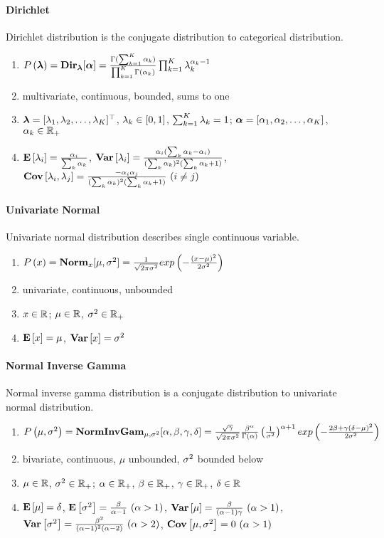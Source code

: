 \paragraph{Dirichlet}

Dirichlet distribution is the conjugate distribution to categorical distribution.
\begin{enumerate}
	\item $P\left(\boldsymbol{\lambda}\right)=\mathbf{Dir}_{\boldsymbol{\lambda}}[\boldsymbol{\alpha}]=\frac{\Gamma(\sum_{k=1}^K\alpha_k)}{\prod_{k=1}^K\Gamma(\alpha_k)}\prod_{k=1}^K\lambda_k^{\alpha_k-1}$
	\item multivariate, continuous, bounded, sums to one
	\item $\boldsymbol{\lambda}=[\lambda_1,\lambda_2,\dotsc,\lambda_K]{}^\top$, $\lambda_k \in [0,1]$, $\sum_{k=1}^K\lambda_k=1$; $\boldsymbol{\alpha}=[\alpha_1,\alpha_2,\dotsc,\alpha_K]$, $\alpha_k \in \mathbb{R}_+$
	\item $\mathbf{E}\left[\lambda_i\right]=\frac{\alpha_i}{\sum_k\alpha_k}$, $\mathbf{Var}\left[\lambda_i\right]=\frac{\alpha_i(\sum_k\alpha_k-\alpha_i)}{(\sum_k\alpha_k)^2(\sum_k\alpha_k+1)}$, $\C{\la_i,\la_j}=\frac{-\al_i\al_j}{(\sum_k\al_k)^2(\sum_k\al_k+1)}\ (i \neq j)$
\end{enumerate}

\paragraph{Univariate Normal}

Univariate normal distribution describes single continuous variable.
\begin{enumerate}
	\item $P\left(x\right)=\mathbf{Norm}_x[\mu,\sigma^2]=\frac{1}{\sqrt{2\pi\sigma^2}}exp\left(-\frac{(x-\mu)^2}{2\sigma^2}\right)$
	\item univariate, continuous, unbounded
	\item $x \in \mathbb{R}$; $\mu \in \mathbb{R}$, $\sigma^2 \in \mathbb{R}_+$
	\item $\mathbf{E}\left[x\right]=\mu$, $\mathbf{Var}\left[x\right]=\sigma^2$
\end{enumerate}

\paragraph{Normal Inverse Gamma}

Normal inverse gamma distribution is a conjugate distribution to univariate normal distribution.
\begin{enumerate}
	\item $P\left(\mu,\sigma^2\right)=\mathbf{NormInvGam}_{\mu,\sigma^2}[\alpha,\beta,\gamma,\delta]=\frac{\sqrt{\gamma}}{\sqrt{2\pi\sigma^2}}\frac{\beta^\alpha}{\Gamma(\alpha)}\left(\frac{1}{\sigma^2}\right)^{\alpha+1}exp\left(-\frac{2\beta+\gamma(\delta-\mu)^2}{2\sigma^2}\right)$
	\item bivariate, continuous, $\mu$ unbounded, $\sigma^2$ bounded below
	\item $\mu \in \mathbb{R}$, $\sigma^2 \in \mathbb{R}_+$; $\alpha \in \mathbb{R}_+$, $\beta \in \mathbb{R}_+$, $\gamma \in \mathbb{R}_+$, $\delta \in \mathbb{R}$
	\item $\mathbf{E}\left[\mu\right]=\delta$, $\mathbf{E}\left[\sigma^2\right]=\frac{\beta}{\alpha-1}\ (\alpha>1)$, $\V{\mu}=\frac{\be}{(\al-1)\ga}\ (\al>1)$, $\V{\si^2}=\frac{\be^2}{(\al-1)^2(\al-2)}\ (\al>2)$, $\C{\mu,\si^2}=0\ (\al>1)$
\end{enumerate}

